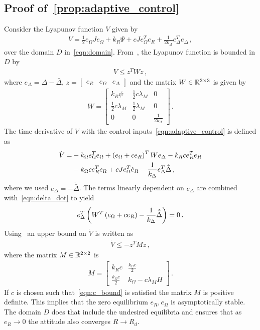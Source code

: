\documentclass[letterpaper, 10 pt, conference]{ieeeconf}  %
\begin{document}
\subsection{Proof of~\cref{prop:adaptive_control}}\label{proof:adaptive_control}
	Consider the Lyapunov function \( V \) given by
	\begin{gather}
		V = \frac{1}{2} e_\Omega J e_\Omega + k_R \Psi + c J e_\Omega^T e_R + \frac{1}{2 k_\Delta} e_\Delta^T e_\Delta \, , \label{eqn:v_adapt}
	\end{gather}
	over the domain \( D \) in~\cref{eqn:domain}.
	From~, the Lyapunov function is bounded in \( D \) by
	\begin{gather}
		V \leq z^T W z \, , \label{eqn:v_upper_bound}
	\end{gather}
	where \( e_\Delta = \Delta - \bar{\Delta} \), \( z = \begin{bmatrix}e_R & e_\Omega & e_\Delta\end{bmatrix} \) and the matrix \(W \in \mathbb{R}^{3 \times 3}\) is given by
	\begin{gather*}
		W = \begin{bmatrix}
			k_R \psi & \frac{1}{2} c \lambda_M & 0 \\
			\frac{1}{2} c \lambda_M & \frac{1}{2} \lambda_M & 0 \\
			0 & 0 & \frac{1}{2 k_\Delta}
		\end{bmatrix} \, .
	\end{gather*}
	The time derivative of \( V\) with the control inputs~\cref{eqn:adaptive_control} is defined as
	\begin{align}
		\dot{V} =& - k_\Omega e_\Omega^T e_\Omega + \left( e_\Omega + c e_R \right)^T W e_\Delta - k_R c e_R^T e_R \nonumber\\
		&- k_\Omega c e_R^T e_\Omega + c J e_\Omega^T \dot{e}_R - \frac{1}{k_\Delta} e_\Delta^T \dot{\bar{\Delta}} \, , \label{eqn:vdot}
	\end{align}
	where we used \( \dot{e}_\Delta = - \dot{\bar{\Delta}} \).
	The terms linearly dependent on \( e_\Delta\) are combined with~\cref{eqn:delta_dot} to yield
	\begin{align*}
		 e_\Delta^T \left( W^T \left( e_\Omega + c e_R \right) - \frac{1}{k_\Delta} \dot{\bar{\Delta}} \right) = 0 \, . 
	\end{align*}
	Using~ an upper bound on \( \dot{V} \) is written as
	\begin{gather*}
		\dot{V} \leq -z^T M z \, ,
	\end{gather*}
	where the matrix \( M \in \mathbb{R}^{2 \times 2} \) is 
	\begin{gather}
		M = \begin{bmatrix}
			k_R c & \frac{k_\Omega c}{2} \\
			\frac{k_\Omega c}{2} & k_\Omega - c \lambda_M H
		\end{bmatrix} \, .
	\end{gather}
	If \( c \) is chosen such that~\cref{eqn:c_bound} is satisfied the matrix \( M \) is positive definite.
	This implies that the zero equilibrium \( e_R, e_\Omega\) is asymptotically stable. 
	The domain \( D \) does that include the undesired equilibria and ensures that as \( e_R \to 0 \) the attitude also converges \( R \to R_d \).
\end{document}
